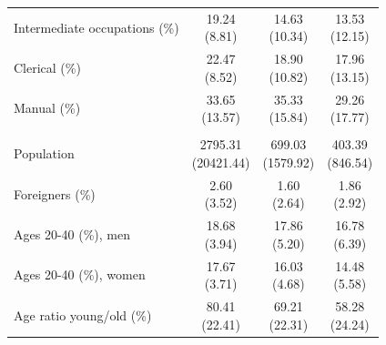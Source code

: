 \begin{table}[!h]
{\begin{tabular}[t]{>{\raggedright\arraybackslash}p{7cm}ccc}
\hspace{1em}Intermediate occupations (\%) & \makecell{19.24 \\ (8.81)} & \makecell{14.63 \\ (10.34)} & \makecell{13.53 \\ (12.15)}\\
\hspace{1em}Clerical (\%) & \makecell{22.47 \\ (8.52)} & \makecell{18.90 \\ (10.82)} & \makecell{17.96 \\ (13.15)}\\
\hspace{1em}Manual (\%) & \makecell{33.65 \\ (13.57)} & \makecell{35.33 \\ (15.84)} & \makecell{29.26 \\ (17.77)}\\
\addlinespace[0.3em]
\multicolumn{4}{l}{\textbf{Demographics}}\\
\hspace{1em}Population & \makecell{2795.31 \\ (20421.44)} & \makecell{699.03 \\ (1579.92)} & \makecell{403.39 \\ (846.54)}\\
\hspace{1em}Foreigners (\%) & \makecell{2.60 \\ (3.52)} & \makecell{1.60 \\ (2.64)} & \makecell{1.86 \\ (2.92)}\\
\hspace{1em}Ages 20-40 (\%), men & \makecell{18.68 \\ (3.94)} & \makecell{17.86 \\ (5.20)} & \makecell{16.78 \\ (6.39)}\\
\hspace{1em}Ages 20-40 (\%), women & \makecell{17.67 \\ (3.71)} & \makecell{16.03 \\ (4.68)} & \makecell{14.48 \\ (5.58)}\\
\hspace{1em}Age ratio young/old (\%) & \makecell{80.41 \\ (22.41)} & \makecell{69.21 \\ (22.31)} & \makecell{58.28 \\ (24.24)}\\

\end{tabular}}
\end{table}
